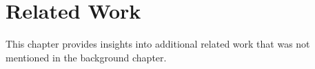 \chapter{Related Work}
\label{cha:related_work}

This chapter provides insights into additional related work that was not mentioned in the background chapter. 

